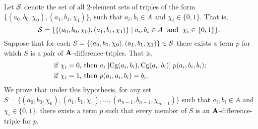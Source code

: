 \documentclass[11pt]{amsart}
\numberwithin{equation}{section}
\theoremstyle{plain}
\theoremstyle{definition}
\begin{document}
Let $\mathcal{S}$ denote the set of all 2-element sets of triples of the form
$\{(a_0, b_0, \chi_0), (a_1, b_1, \chi_1)\}$, such that
$a_i, b_i \in A$ and $\chi_i \in \{0,1\}$.
That is,
\[
\mathcal{S}= \{\{(a_0, b_0, \chi_0), (a_1, b_1, \chi_1)\} \mid
a_i, b_i \in A \; \text{ and } \; \chi_i \in \{0,1\}\}.
\]
Suppose that for each
$S = \{(a_0, b_0, \chi_0), (a_1, b_1, \chi_1)\} \in \mathcal{S}$ there exists a term $p$
for which $S$ is a pair of $\mathbf{A}$-difference-triples. That is, 
\begin{align*}
\text{ if $\chi_i=0$, then } &a_i \mathrel{[\operatorname{Cg}(a_i,b_i), \operatorname{Cg}(a_i,b_i)]} p(a_i,b_i,b_i); \\
\text{ if $\chi_i=1$, then } &p(a_i,a_i,b_i) =b_i.
\end{align*}
We prove that under this hypothesis, for any set
$S = \{(a_0, b_0, \chi_0), (a_1, b_1, \chi_1), \dots, (a_{n-1}, b_{n-1},\chi_{n-1})\}$
such that $a_i, b_i \in A$ and $\chi_i \in \{0,1\}$, there exists a term $p$
such that every member of $S$ is an $\mathbf{A}$-difference-triple for $p$.

\printbibliography
\end{document}
